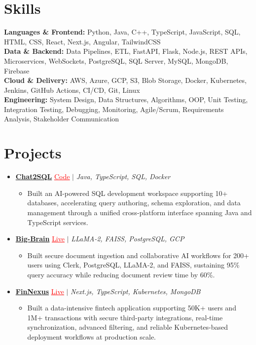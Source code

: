 \documentclass[letterpaper,10pt]{article}
\newcommand{\itemTail}{\vspace{-4pt}}
\newcommand{\sectionGap}{\vspace{-8pt}}
\newcommand{\projGap}{\vspace{3pt}}
\newcommand{\resumeItem}[1]{\item\small{{#1 \itemTail}}}
\newcommand{\resumeProjectHeading}[1]{\item \small #1 \vspace{-2pt}}
\newcommand{\resumeProjectLink}[2]{\href{#1}{\textcolor{red}{\underline{#2}}}}
\newcommand{\resumeSubHeadingListStart}{\begin{itemize}[leftmargin=0.0in, label={}]}
\newcommand{\resumeSubHeadingListEnd}{\end{itemize}}
\newcommand{\resumeProjItemListStart}{\begin{itemize}[leftmargin=0.15in,label=\textbullet,itemsep=3pt,topsep=0pt,parsep=0pt,partopsep=0pt]}
\newcommand{\resumeProjItemListEnd}{\end{itemize}\vspace{-4pt}}
\begin{document}
\section{Skills}
\begin{itemize}[leftmargin=0.15in, label={}]
\small{\item{
\textbf{Languages \& Frontend:} Python, Java, C++, TypeScript, JavaScript, SQL, HTML, CSS, React, Next.js, Angular, TailwindCSS \\
\textbf{Data \& Backend:} Data Pipelines, ETL, FastAPI, Flask, Node.js, REST APIs, Microservices, WebSockets, PostgreSQL, SQL Server, MySQL, MongoDB, Firebase \\
\textbf{Cloud \& Delivery:} AWS, Azure, GCP, S3, Blob Storage, Docker, Kubernetes, Jenkins, GitHub Actions, CI/CD, Git, Linux \\
\textbf{Engineering:} System Design, Data Structures, Algorithms, OOP, Unit Testing, Integration Testing, Debugging, Monitoring, Agile/Scrum, Requirements Analysis, Stakeholder Communication
}}
\end{itemize}
\sectionGap
\section{Projects}
\resumeSubHeadingListStart
\vspace{-2pt}
\resumeProjectHeading{\href{https://github.com/SAHAJ-BHADJA/Chat2SQL}{\textbf{Chat2SQL}} \resumeProjectLink{https://github.com/SAHAJ-BHADJA/Chat2SQL}{Code} $|$ \emph{Java, TypeScript, SQL, Docker}}
\resumeProjItemListStart
\resumeItem{Built an AI-powered SQL development workspace supporting 10+ databases, accelerating query authoring, schema exploration, and data management through a unified cross-platform interface spanning Java and TypeScript services.}
\resumeProjItemListEnd
\projGap
\resumeProjectHeading{\href{https://big-brain-pied.vercel.app/}{\textbf{Big-Brain}} \resumeProjectLink{https://big-brain-pied.vercel.app/}{Live} $|$ \emph{LLaMA-2, FAISS, PostgreSQL, GCP}}
\resumeProjItemListStart
\resumeItem{Built secure document ingestion and collaborative AI workflows for 200+ users using Clerk, PostgreSQL, LLaMA-2, and FAISS, sustaining 95\% query accuracy while reducing document review time by 60\%.}
\resumeProjItemListEnd
\projGap
\resumeProjectHeading{\href{https://fin-nexus.vercel.app/}{\textbf{FinNexus}} \resumeProjectLink{https://fin-nexus.vercel.app/}{Live} $|$ \emph{Next.js, TypeScript, Kubernetes, MongoDB}}
\resumeProjItemListStart
\resumeItem{Built a data-intensive fintech application supporting 50K+ users and 1M+ transactions with secure third-party integrations, real-time synchronization, advanced filtering, and reliable Kubernetes-based deployment workflows at production scale.}
\resumeProjItemListEnd
\resumeSubHeadingListEnd
\end{document}
